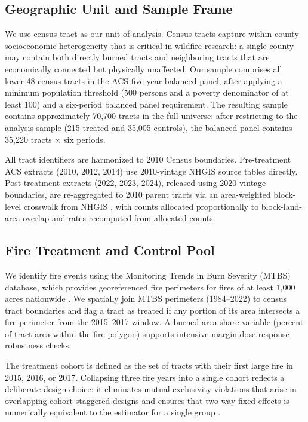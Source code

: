 \documentclass[12pt]{article}
\begin{document}
\subsection{Geographic Unit and Sample Frame}

We use census tract as our unit of analysis.
Census tracts capture within-county socioeconomic heterogeneity
that is critical in wildfire research: a single county may contain
both directly burned tracts and neighboring tracts that are
economically connected but physically unaffected.
Our sample comprises all lower-48 census tracts in the ACS five-year
balanced panel, after applying a minimum population threshold
(500 persons and a poverty denominator of at least 100)
and a six-period balanced panel requirement.
The resulting sample contains approximately 70,700 tracts in the full universe;
after restricting to the analysis sample (215 treated and 35,005 controls),
the balanced panel contains 35,220 tracts $\times$ six periods.

All tract identifiers are harmonized to 2010 Census boundaries.
Pre-treatment ACS extracts (2010, 2012, 2014) use 2010-vintage NHGIS
source tables directly.
Post-treatment extracts (2022, 2023, 2024), released using 2020-vintage
boundaries, are re-aggregated to 2010 parent tracts via an area-weighted
block-level crosswalk from NHGIS
\citep{NHGIS2024},
with counts allocated proportionally to block-land-area overlap
and rates recomputed from allocated counts.

\subsection{Fire Treatment and Control Pool}

We identify fire events using the Monitoring Trends in Burn Severity (MTBS)
database, which provides georeferenced fire perimeters for fires of at least
1,000 acres nationwide \citep{MTBS2022}.
We spatially join MTBS perimeters (1984--2022) to census tract boundaries
and flag a tract as treated if any portion of its area intersects a fire
perimeter from the 2015--2017 window.
A burned-area share variable (percent of tract area within the fire polygon)
supports intensive-margin dose-response robustness checks.

The treatment cohort is defined as the set of tracts with their first large
fire in 2015, 2016, or 2017.
Collapsing three fire years into a single cohort reflects a deliberate
design choice: it eliminates mutual-exclusivity violations that arise
in overlapping-cohort staggered designs and ensures that two-way fixed
effects is numerically equivalent to the
\citet{callaway2021difference} estimator for a single group \citep{goodman2021difference}.
\end{document}
